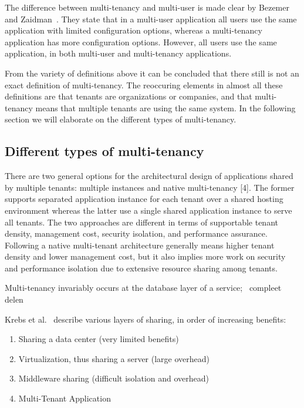 The difference between multi-tenancy and multi-user is made clear by Bezemer and Zaidman~\cite{bezemer2010multi}. They state that in a multi-user application all users use the same application with limited configuration options, whereas a multi-tenancy application has more configuration options. However, all users use the same application, in both multi-user and multi-tenancy applications. %

From the variety of definitions above it can be concluded that there still is not an exact definition of multi-tenancy. The reoccuring elements in almost all these definitions are that tenants are organizations or companies, and that multi-tenancy means that multiple tenants are using the same system. In the following section we will elaborate on the different types of multi-tenancy. 

\subsection{Different types of multi-tenancy}

There are two general options for the architectural design of applications shared by multiple tenants: multiple instances and native multi-tenancy [4]. The former supports separated application instance for each tenant over a shared hosting environment whereas the latter use a single shared application instance to serve all tenants. The two approaches are different in terms of supportable tenant density, management cost, security isolation, and performance assurance. Following a native multi-tenant architecture generally means higher tenant density and lower management cost, but it also implies more work on security and performance isolation due to extensive resource sharing among tenants.~\cite{lin2009feedback}



Multi-tenancy invariably occurs at the database layer of a service;~\cite{aulbach2008multi}
compleet delen~\cite{aulbach2009comparison}


Krebs et al.~\cite{krebs2012architecture} describe various layers of sharing, in order of increasing benefits:
\begin{enumerate}
\item Sharing a data center (very limited benefits)
\item Virtualization, thus sharing a server (large overhead)
\item Middleware sharing (difficult isolation and overhead)
\item Multi-Tenant Application
\end{enumerate}

